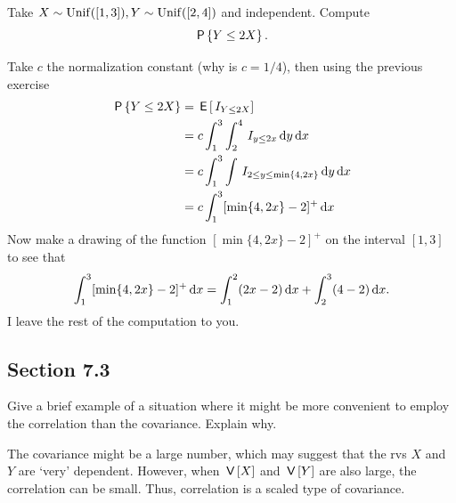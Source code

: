 \begin{exercise}\label{ex:2a}
Take $X\sim\mathrm{Unif}([1,3]), Y\sim\mathrm{Unif}([2,4])$ and independent. Compute
\begin{equation}
  \label{eq:824}
\P{Y\leq 2X}.
\end{equation}
\begin{solution}
Take $c$ the normalization constant (why is $c=1/4$), then using the previous exercise
\begin{align}
\,\mathsf{P}\left\{Y\leq 2X\right\}
&=\,\mathsf{E}\left[\,I_{Y\leq 2X}\right] \\
&=c \int_{1}^{3}\int_{2}^{4} \,I_{y\leq 2x} \,\textrm{d}y \,\textrm{d}x \\
&=c \int_{1}^{3}\int \,I_{2\leq y\leq \min\{4,2x\}}  \,\textrm{d}y \,\textrm{d}x \\
&=c \int_{1}^{3} [\min\{4, 2x\} -2]^{+} \,\textrm{d}x
\end{align}
Now make a drawing of the function $[\min\{4, 2x\} - 2]^{+}$ on the interval $[1,3]$ to see that
\begin{equation}
\int_{1}^{3} [\min\{4, 2x\} -2]^{+} \,\textrm{d}x = \int_{1}^{2} (2x -2) \,\textrm{d}x + \int_{2}^{3} (4 -2) \,\textrm{d}x.
\end{equation}
I leave the rest of the computation to you.
\end{solution}
\end{exercise}


\subsection*{Section 7.3}
\label{sec:section-7.3}



\begin{exercise}
Give a brief example of a situation where it might be more convenient to employ the correlation than the covariance.  Explain why.
\begin{solution}
The covariance might be a large number, which may  suggest that the rvs $X$ and $Y$ are `very' dependent. However, when $\,\mathsf{V}\left[X\right]$ and $\,\mathsf{V}\left[Y\right]$ are also large, the correlation can be small. Thus, correlation is a scaled type of covariance.
\end{solution}
\end{exercise}

